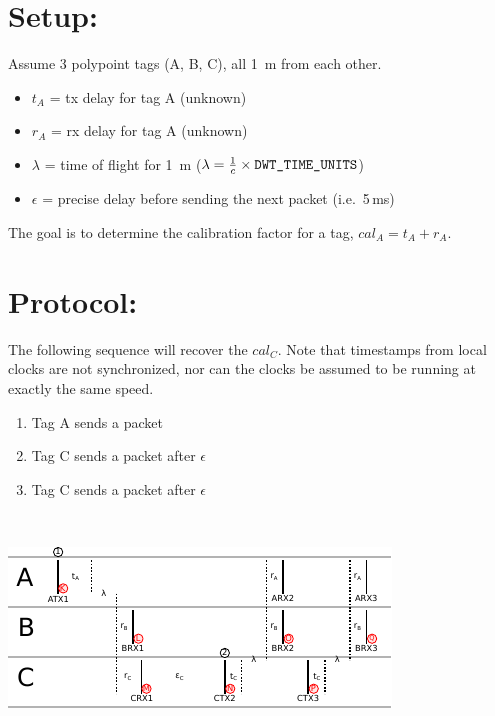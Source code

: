 \documentclass{article}
\begin{document}
\newcommand{\tda}[1]{\textcolor{red}{#1}}
\newcommand{\tdb}[1]{\textcolor{orange}{#1}}
\newcommand{\tdc}[1]{\textcolor{blue}{#1}}
\newcommand{\unk}[1]{\textcolor{red}{#1}}
\newcommand{\der}[1]{\textcolor{orange}{#1}}
\newcommand{\off}[2]{\textnormal{\emph{Off}}_{#1\rightarrow#2}}

\section*{Setup:} Assume 3 polypoint tags (A, B, C), all 1~m from each other.

\begin{itemize}
  \item $t_A$ = tx delay for tag A (unknown)
  \item $r_A$ = rx delay for tag A (unknown)
  \item $\lambda$ = time of flight for 1~m ($\lambda = \frac{1}{c}\times\textnormal{\texttt{DWT\_TIME\_UNITS}}$)
  \item $\epsilon$ = precise delay before sending the next packet (i.e.\ 5\,ms)
\end{itemize}

The goal is to determine the calibration factor for a tag, $cal_A = t_A + r_A$.

\section*{Protocol:}

The following sequence will recover the $cal_C$. Note that timestamps from
local clocks are not synchronized, nor can the clocks be assumed to be running
at exactly the same speed.

\bigskip

\noindent
\begin{minipage}{.35\textwidth}
  \begin{enumerate}
    \item Tag A sends a packet
    \item Tag C sends a packet after $\epsilon$
    \item Tag C sends a packet after $\epsilon$
  \end{enumerate}
\end{minipage}%
~~~~~%
\begin{minipage}{.65\textwidth}
  \includegraphics[width=\linewidth]{calibration_diagram}
\end{minipage}
\end{document}
